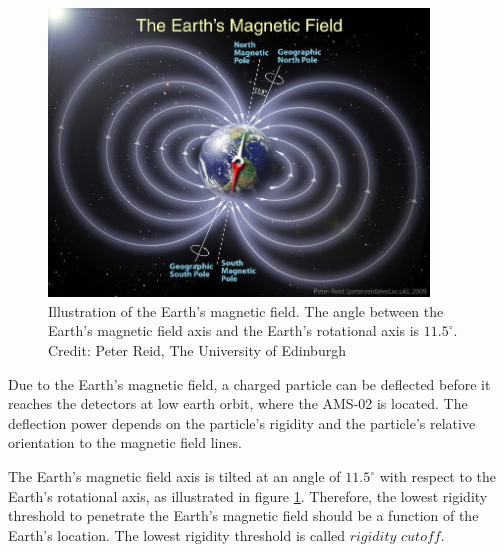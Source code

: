 
\begin{figure}[htb]
\centering
\includegraphics[width=0.9\textwidth, height=0.37\textheight]{Figures/chapter4/MeasuringTime/Earths-Magnetic-Field-Schematic-Illustration.jpg}
\caption[Illustration of the Earth’s magnetic field.]{Illustration of the Earth’s magnetic field. The angle between the Earth’s magnetic field axis and the Earth’s rotational axis is $11.5^{\circ}$. Credit: Peter Reid, The University of Edinburgh}
\label{EarthMagneticField}
\end{figure}

Due to the Earth's magnetic field, a charged particle can be deflected before it reaches the detectors at low earth orbit, where the AMS-02 is located. The deflection power depends on the particle's rigidity and the particle's relative orientation to the magnetic field lines. \par

The Earth’s magnetic field axis is tilted at an angle of $11.5^{\circ}$ with respect to the Earth’s rotational axis, as illustrated in figure \ref{EarthMagneticField}. Therefore, the lowest rigidity threshold to penetrate the Earth's magnetic field should be a function of the Earth's location. The lowest rigidity threshold is called $\textit{rigidity cutoff}$. \par    


